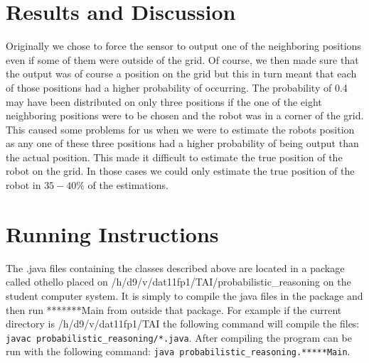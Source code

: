 \documentclass[a4paper]{article}
\begin{document}
\section{Results and Discussion}
Originally we chose to force the sensor to output one of the neighboring positions even if some of them were outside of the grid. Of course, we then made sure that the output was of course a position on the grid but this in turn meant that each of those positions had a higher probability of occurring. The probability of 0.4 may have been distributed on only three positions if the one of the eight neighboring positions were to be chosen and the robot was in a corner of the grid. This caused some problems for us when we were to estimate the robots position as any one of these three positions had a higher probability of being output than the actual position. This made it difficult to estimate the true position of the robot on the grid. In those cases we could only estimate the true position of the robot in $35 - 40\%$ of the estimations.

\section{Running Instructions} The .java files containing the classes described
above are located in a package called othello placed on
/h/d9/v/dat11fp1/TAI/probabilistic\_reasoning on the student computer system. It
is simply to compile the java files in the package and then run *******Main from
outside that package. For example if the current directory is
/h/d9/v/dat11fp1/TAI the following command will compile the files: \texttt{javac
probabilistic\_reasoning/*.java}. After compiling the program can be run with
the following command: \texttt{java probabilistic\_reasoning.*****Main}.

\end{document}
